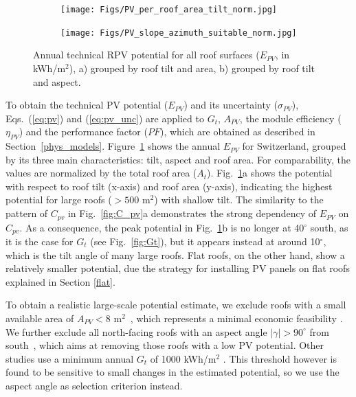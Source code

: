 \begin{figure}[tb]
\centering
\begin{subfigure}{.48\textwidth}
  \centering
  \texttt{[image: Figs/PV\_per\_roof\_area\_tilt\_norm.jpg]} 
  \subcaption{}
\end{subfigure}
\begin{subfigure}{.48\textwidth}
  \centering
  \texttt{[image: Figs/PV\_slope\_azimuth\_suitable\_norm.jpg]}
  \subcaption{}
\end{subfigure}
\caption{Annual technical RPV potential for all roof surfaces ($E_{PV}$, in kWh/m$^2$), a) grouped by roof tilt and area, b) grouped by roof tilt and aspect.}
\label{fig:pv_roof}
\end{figure}

To obtain the technical PV potential ($E_{PV}$) and its uncertainty ($\sigma_{PV}$), Eqs.~(\ref{eq:pv}) and (\ref{eq:pv_unc}) are applied to $G_t$, $A_{PV}$, the module efficiency ($\eta_{PV}$) and the performance factor ($\mathit{PF}$), which are obtained as described in Section~\ref{phys_models}.
%
Figure~\ref{fig:pv_roof} shows the annual $E_{PV}$ for Switzerland, grouped by its three main characteristics: tilt, aspect and roof area. For comparability, the values are normalized by the total roof area ($A_t$). 
Fig.~\ref{fig:pv_roof}a shows the potential with respect to roof tilt (x-axis) and roof area (y-axis), indicating the highest potential for large roofs ($> 500$ m$^2$) with shallow tilt. 
The similarity to the pattern of $C_{\mathit{pv}}$ in Fig.~\ref{fig:C_pv}a demonstrates the strong dependency of $E_{PV}$ on $C_{\mathit{pv}}$.
As a consequence, the peak potential in Fig.~\ref{fig:pv_roof}b is no longer at 40$^\circ$ south, as it is the case for $G_t$ (see Fig.~\ref{fig:Gt}), but it appears instead at around 10$^\circ$, which is the tilt angle of many large roofs. 
Flat roofs, on the other hand, show a relatively smaller potential, due the strategy for installing PV panels on flat roofs explained in Section \ref{flat}.

To obtain a realistic large-scale potential estimate, we exclude roofs with a small available area of $A_{PV}<8$ m$^2$~\cite{assouline_large-scale_2018}, which represents a minimal economic feasibility \cite{assouline_quantifying_2017, assouline_large-scale_2018, portmann_sonnendach.ch:_2016, romero_rodriguez_assessment_2017}. 
We further exclude all north-facing roofs with an aspect angle $|\gamma| > 90^\circ$ from south~\cite{assouline_large-scale_2018, assouline_quantifying_2017}, which aims at removing those roofs with a low PV potential. Other studies use a minimum annual $G_t$ of 1000 kWh/m$^2$ \cite{buffat_scalable_2018, portmann_sonnendach.ch:_2016, romero_rodriguez_assessment_2017}. This threshold however is found to be sensitive to small changes in the estimated potential, so we use the aspect angle as selection criterion instead.

